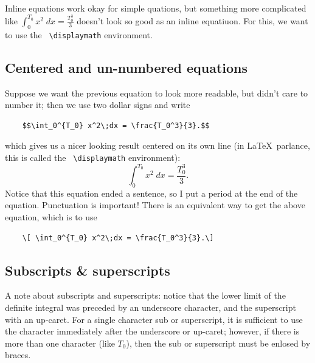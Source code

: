 Inline equations work okay for simple quations, but something more complicated like  $\int_0^{T_0} x^2\;dx = \frac{T_0^3}{3}$ doesn't look so good as an inline equatiuon. For this, we want to use the \verb! \displaymath! environment.

\subsection{Centered and un-numbered equations}
Suppose we want the previous equation to look more readable, but didn't care to number it; then we use two dollar signs and write
\begin{verbatim}
	$$\int_0^{T_0} x^2\;dx = \frac{T_0^3}{3}.$$
\end{verbatim}
which gives us a nicer looking result centered on its own line (in \LaTeX\ parlance, this is called the \verb! \displaymath! environment):
	$$\int_0^{T_0} x^2\;dx = \frac{T_0^3}{3}.$$
Notice that this equation ended a sentence, so I put a period at the end of the equation. Punctuation is important!
There is an equivalent way to get the above equation, which is to use 
\begin{verbatim}
	\[ \int_0^{T_0} x^2\;dx = \frac{T_0^3}{3}.\]
\end{verbatim}
\subsection{Subscripts \& superscripts}
A note about subscripts and superscripts: notice that the lower limit of the definite integral was preceded by an underscore character, and the superscript with an up-caret. For a single character sub or superscript, it is sufficient to use the character immediately after the underscore or up-caret; however, if there is more than one character (like $T_0$), then the sub or superscript must be enlosed by braces.

